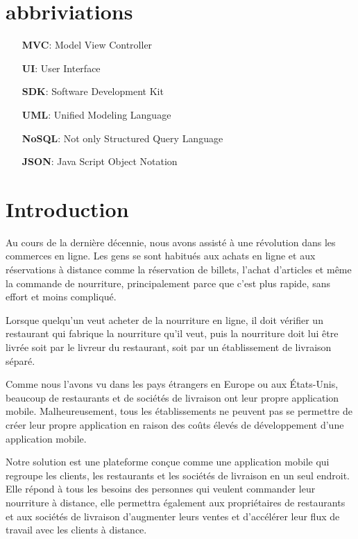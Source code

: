 \documentclass[a4paper]{report}
\begin{document}
\newpage
\chapter*{abbriviations}
	\begin{itemize}
		\item[\textbf{MVC}:] Model View Controller
		\item[\textbf{UI}:] User Interface
		\item[\textbf{SDK}:] Software Development Kit
		\item[\textbf{UML}:] Unified Modeling Language
		\item[\textbf{NoSQL}:] Not only Structured Query Language
		\item[\textbf{JSON}:] Java Script Object Notation
	\end{itemize}


\newpage
\chapter*{Introduction}
    Au cours de la dernière décennie, nous avons assisté à une révolution dans les commerces en ligne. Les gens se sont habitués aux achats en ligne et aux réservations à distance comme la réservation de billets, l'achat d'articles et même la commande de nourriture, principalement parce que c'est plus rapide, sans effort et moins compliqué.

Lorsque quelqu'un veut acheter de la nourriture en ligne, il doit vérifier un restaurant qui fabrique la nourriture qu'il veut, puis la nourriture doit lui être livrée soit par le livreur du restaurant, soit par un établissement de livraison séparé.

Comme nous l'avons vu dans les pays étrangers en Europe ou aux États-Unis, beaucoup de restaurants et de sociétés de livraison ont leur propre application mobile. Malheureusement, tous les établissements ne peuvent pas se permettre de créer leur propre application en raison des coûts élevés de développement d'une application mobile.

Notre solution est une plateforme conçue comme une application mobile qui regroupe les clients, les restaurants et les sociétés de livraison en un seul endroit. Elle répond à tous les besoins des personnes qui veulent commander leur nourriture à distance, elle permettra également aux propriétaires de restaurants et aux sociétés de livraison d'augmenter leurs ventes et d'accélérer leur flux de travail avec les clients à distance.
\end{document}
